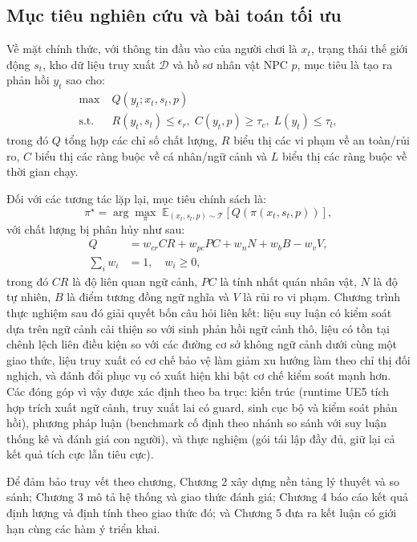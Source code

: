 ﻿\documentclass[a4paper,12pt]{article}
\begin{document}
\subsection{Mục tiêu nghiên cứu và bài toán tối ưu}
Về mặt chính thức, với thông tin đầu vào của người chơi là \(x_t\), trạng thái thế giới động \(s_t\), kho dữ liệu truy xuất \(\mathcal{D}\) và hồ sơ nhân vật NPC \(p\), mục tiêu là tạo ra phản hồi \(y_t\) sao cho:
\begin{align}
\max\; &Q(y_t; x_t, s_t, p) \\
\text{s.t. } &R(y_t, s_t) \le \epsilon_r,\; C(y_t,p) \ge \tau_c,\; L(y_t) \le \tau_l,
\end{align}
trong đó \(Q\) tổng hợp các chỉ số chất lượng, \(R\) biểu thị các vi phạm về an toàn/rủi ro, \(C\) biểu thị các ràng buộc về cá nhân/ngữ cảnh và \(L\) biểu thị các ràng buộc về thời gian chạy.

Đối với các tương tác lặp lại, mục tiêu chính sách là:
\begin{equation}
\pi^\star=\arg\max_{\pi}\;\mathbb{E}_{(x_t,s_t,p)\sim\mathcal{T}}\left[Q\!\left(\pi(x_t,s_t,p)\right)\right],
\end{equation}
với chất lượng bị phân hủy như sau:
\begin{equation}
\begin{aligned}
Q &= w_{cr}CR + w_{pc}PC + w_nN + w_bB - w_vV,\\
\sum_i w_i &= 1,\quad w_i\ge0,
\end{aligned}
\end{equation}
trong đó \(CR\) là độ liên quan ngữ cảnh, \(PC\) là tính nhất quán nhân vật, \(N\) là độ tự nhiên, \(B\) là điểm tương đồng ngữ nghĩa và \(V\) là rủi ro vi phạm. Chương trình thực nghiệm sau đó giải quyết bốn câu hỏi liên kết: liệu suy luận có kiểm soát dựa trên ngữ cảnh cải thiện so với sinh phản hồi ngữ cảnh thô, liệu có tồn tại chênh lệch liên điều kiện so với các đường cơ sở không ngữ cảnh dưới cùng một giao thức, liệu truy xuất có cơ chế bảo vệ làm giảm xu hướng làm theo chỉ thị đối nghịch, và đánh đổi phục vụ có xuất hiện khi bật cơ chế kiểm soát mạnh hơn. Các đóng góp vì vậy được xác định theo ba trục: kiến trúc (runtime UE5 tích hợp trích xuất ngữ cảnh, truy xuất lai có guard, sinh cục bộ và kiểm soát phản hồi), phương pháp luận (benchmark cố định theo nhánh so sánh với suy luận thống kê và đánh giá con người), và thực nghiệm (gói tái lập đầy đủ, giữ lại cả kết quả tích cực lẫn tiêu cực).

Để đảm bảo truy vết theo chương, Chương 2 xây dựng nền tảng lý thuyết và so sánh; Chương 3 mô tả hệ thống và giao thức đánh giá; Chương 4 báo cáo kết quả định lượng và định tính theo giao thức đó; và Chương 5 đưa ra kết luận có giới hạn cùng các hàm ý triển khai.
\end{document}
